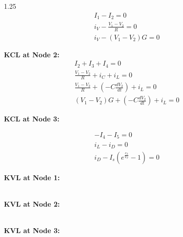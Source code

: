 \begin{spacing}{1.25}
\begin{gather*}
    I_1 - I_2 = 0 \\
    i_{V} - \frac{V_{1} - V_{2}}{R} = 0 \\
    i_{V} - (V_{1} - V_{2})G = 0
\end{gather*}

\textbf{KCL at Node 2:}
\begin{gather*}
    I_2 + I_3 + I_4 = 0 \\
    \frac{V_{1} - V_{2}}{R} + i_{C} + i_{L} = 0 \\
    \frac{V_{1} - V_{2}}{R} + \left(- C\frac{dV_{2}}{dt}\right) + i_{L} = 0 \\
    (V_{1} - V_{2})G + \left(- C\frac{dV_{2}}{dt}\right) + i_{L} = 0
\end{gather*}

\textbf{KCL at Node 3:}

\begin{gather*}
    -I_4 - I_5 = 0 \\
    i_{L} - i_{D} = 0 \\
    i_{D} - I_s \left( e^{\frac{e_3}{V_T}} - 1 \right) = 0
\end{gather*}

\textbf{KVL at Node 1:}

\begin{gather*}
    
\end{gather*}

\textbf{KVL at Node 2:}

\begin{gather*}
    
\end{gather*}

\textbf{KVL at Node 3:}

\begin{gather*}
    
\end{gather*}







\end{spacing}
